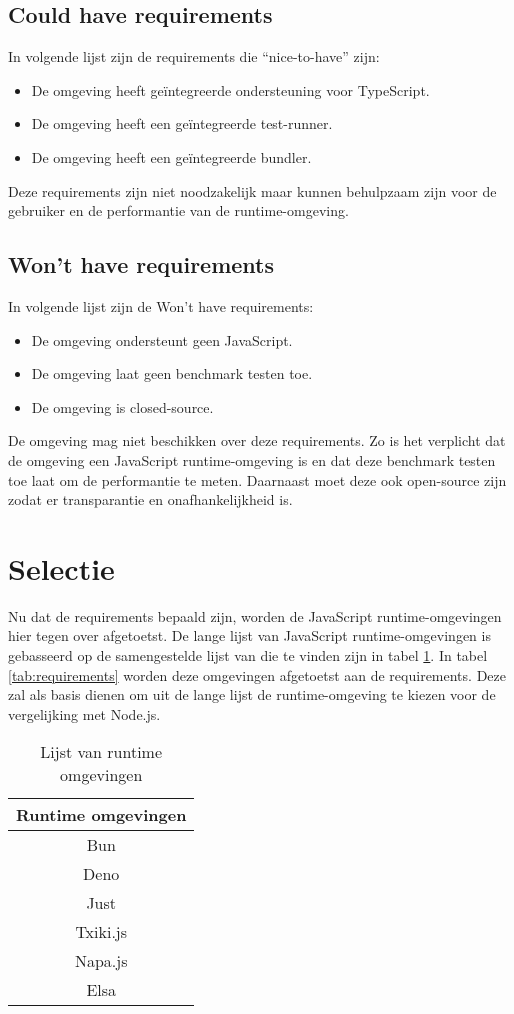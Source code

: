 \subsection{Could have requirements}
In volgende lijst zijn de requirements die “nice-to-have” zijn:
\begin{itemize}
    \item De omgeving heeft geïntegreerde ondersteuning voor TypeScript.
    \item De omgeving heeft een geïntegreerde test-runner.
    \item De omgeving heeft een geïntegreerde bundler.
\end{itemize}
Deze requirements zijn niet noodzakelijk maar kunnen behulpzaam zijn voor de gebruiker en de performantie van de runtime-omgeving.

\subsection{Won't have requirements}
In volgende lijst zijn de Won't have requirements:
\begin{itemize}
    \item De omgeving ondersteunt geen JavaScript.
    \item De omgeving laat geen benchmark testen toe. 
    \item De omgeving is closed-source.
\end{itemize}
De omgeving mag niet beschikken over deze requirements. 
Zo is het verplicht dat de omgeving een JavaScript runtime-omgeving is en dat deze benchmark testen toe laat om de performantie te meten.
Daarnaast moet deze ook open-source zijn zodat er transparantie en onafhankelijkheid is.

\section{Selectie}
Nu dat de requirements bepaald zijn, worden de JavaScript runtime-omgevingen hier tegen over afgetoetst.
De lange lijst van JavaScript runtime-omgevingen is gebasseerd op de samengestelde lijst van \textcite{Errilaz2023} 
die te vinden zijn in tabel \ref{tab:omgevingen}.
In tabel \ref{tab:requirements} worden deze omgevingen afgetoetst aan de requirements. 
Deze zal als basis dienen om uit de lange lijst de runtime-omgeving te kiezen voor de vergelijking met Node.js.
\begin{table}[H]
    \begin{tabular}{|c|}
    \hline
    \textbf{Runtime omgevingen} \\ \hline
    Bun                         \\
    Deno                        \\
    Just                        \\
    Txiki.js                    \\
    Napa.js                     \\
    Elsa                        \\ \hline
    \end{tabular}
    \caption{\label{tab:omgevingen}Lijst van runtime omgevingen}
\end{table}

